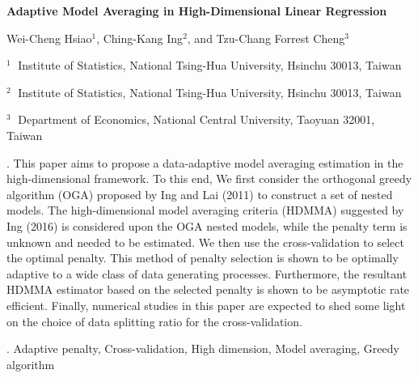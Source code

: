 \documentclass[12pt]{article}
\begin{document}
\begin{flushleft}


{\LARGE\bf Adaptive Model Averaging in High-Dimensional Linear Regression}


\vspace{1.0cm}

Wei-Cheng Hsiao$^1$, Ching-Kang Ing$^2$, and Tzu-Chang Forrest Cheng$^3$

\begin{description}

\item $^1 \;$ Institute of Statistics, National Tsing-Hua University, Hsinchu 30013, Taiwan 

\item $^2 \;$ Institute of Statistics, National Tsing-Hua University, Hsinchu 30013, Taiwan 


\item $^3 \;$ Department of Economics, National Central University, Taoyuan 32001, Taiwan
\end{description}

\end{flushleft}


\vspace{0.75cm}

. This paper aims to propose a data-adaptive model averaging estimation in the high-dimensional framework. To this end, We first consider the orthogonal greedy algorithm (OGA) proposed by Ing and Lai (2011) to construct a set of nested models. The high-dimensional model averaging criteria (HDMMA) suggested by Ing (2016) is considered upon the OGA nested models, while the penalty term is unknown and needed to be estimated. We then use the cross-validation to select the optimal penalty. This method of penalty selection is shown to be optimally adaptive to a wide class of data generating processes. Furthermore, the resultant HDMMA estimator based on the selected penalty is shown to be asymptotic rate efficient. Finally, numerical studies in this paper are expected to shed some light on the choice of data splitting ratio for the cross-validation. 

\vskip 2mm

.
Adaptive penalty, Cross-validation, High dimension, Model averaging, Greedy algorithm
\end{document}

